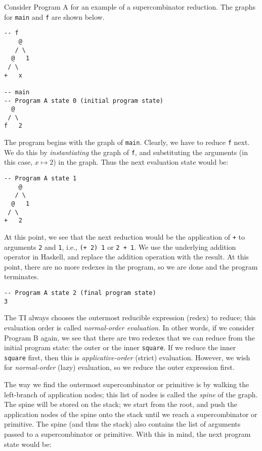 Consider Program A for an example of a supercombinator reduction. The graphs for \texttt{main} and \texttt{f} are shown below.

\begin{verbatim}
-- f
    @
   / \
  @   1
 / \
+   x

-- main
-- Program A state 0 (initial program state)
  @
 / \
f   2
\end{verbatim}

The program begins with the graph of \texttt{main}. Clearly, we have to reduce \texttt{f} next. We do this by \textit{instantiating} the graph of \texttt{f}, and substituting the arguments (in this case, $x\mapsto 2$) in the graph. Thus the next evaluation state would be:

\begin{verbatim}
-- Program A state 1
    @
   / \
  @   1
 / \
+   2
\end{verbatim}

At this point, we see that the next reduction would be the application of \texttt{+} to arguments \texttt{2} and \texttt{1}, i.e., \texttt{(+ 2) 1} or \texttt{2 + 1}. We use the underlying addition operator in Haskell, and replace the addition operation with the result. At this point, there are no more redexes in the program, so we are done and the program terminates.

\begin{verbatim}
-- Program A state 2 (final program state)
3
\end{verbatim}

The TI always chooses the outermost reducible expression (redex) to reduce; this evaluation order is called \textit{normal-order evaluation}. In other words, if we consider Program B again, we see that there are two redexes that we can reduce from the initial program state: the outer or the inner \texttt{square}. If we reduce the inner \texttt{square} first, then this is \textit{applicative-order} (strict) evaluation. However, we wish for \textit{normal-order} (lazy) evaluation, so we reduce the outer expression first.

The way we find the outermost supercombinator or primitive is by walking the left-branch of application nodes; this list of nodes is called the \textit{spine} of the graph. The spine will be stored on the stack; we start from the root, and push the application nodes of the spine onto the stack until we reach a supercombinator or primitive. The spine (and thus the stack) also contains the list of arguments passed to a supercombinator or primitive. With this in mind, the next program state would be:

